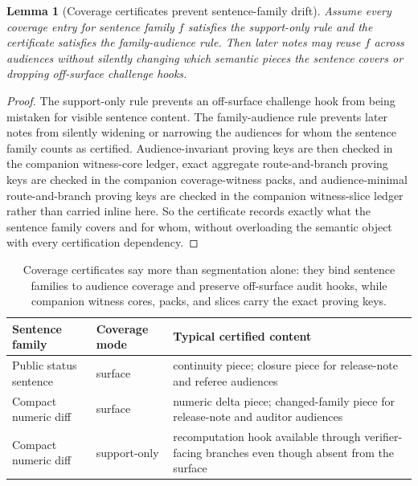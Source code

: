 \documentclass[11pt]{article}
\newtheorem{lemma}{Lemma}
\begin{document}
\begin{lemma}[Coverage certificates prevent sentence-family drift]
Assume every coverage entry for sentence family $f$ satisfies the support-only rule and the certificate satisfies the family-audience rule.
Then later notes may reuse $f$ across audiences without silently changing which semantic pieces the sentence covers or dropping off-surface challenge hooks.
\end{lemma}

\begin{proof}
The support-only rule prevents an off-surface challenge hook from being mistaken for visible sentence content.
The family-audience rule prevents later notes from silently widening or narrowing the audiences for whom the sentence family counts as certified.
Audience-invariant proving keys are then checked in the companion witness-core ledger, exact aggregate route-and-branch proving keys are checked in the companion coverage-witness packs, and audience-minimal route-and-branch proving keys are checked in the companion witness-slice ledger rather than carried inline here.
So the certificate records exactly what the sentence family covers and for whom, without overloading the semantic object with every certification dependency.
\end{proof}

\begin{table}[t]
\centering
\small
\begin{tabularx}{\linewidth}{@{}l l X@{}}
\toprule
Sentence family & Coverage mode & Typical certified content \\
\midrule
Public status sentence & surface & continuity piece; closure piece for release-note and referee audiences \\
Compact numeric diff & surface & numeric delta piece; changed-family piece for release-note and auditor audiences \\
Compact numeric diff & support-only & recomputation hook available through verifier-facing branches even though absent from the surface \\
\bottomrule
\end{tabularx}
\caption{Coverage certificates say more than segmentation alone: they bind sentence families to audience coverage and preserve off-surface audit hooks, while companion witness cores, packs, and slices carry the exact proving keys.}
\label{tab:coverage}
\end{table}
\end{document}
